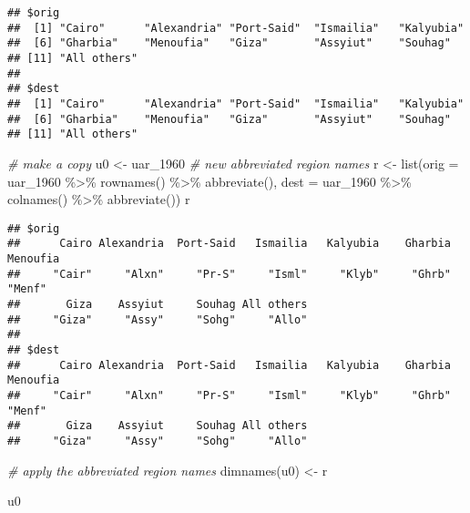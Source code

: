 \documentclass[
]{book}
\newenvironment{Shaded}{\begin{snugshade}}{\end{snugshade}}
\newcommand{\AttributeTok}[1]{\textcolor[rgb]{0.77,0.63,0.00}{#1}}
\newcommand{\CommentTok}[1]{\textcolor[rgb]{0.56,0.35,0.01}{\textit{#1}}}
\newcommand{\FunctionTok}[1]{\textcolor[rgb]{0.00,0.00,0.00}{#1}}
\newcommand{\NormalTok}[1]{#1}
\newcommand{\OtherTok}[1]{\textcolor[rgb]{0.56,0.35,0.01}{#1}}
\newcommand{\SpecialCharTok}[1]{\textcolor[rgb]{0.00,0.00,0.00}{#1}}
\begin{document}
\begin{verbatim}
## $orig
##  [1] "Cairo"      "Alexandria" "Port-Said"  "Ismailia"   "Kalyubia"  
##  [6] "Gharbia"    "Menoufia"   "Giza"       "Assyiut"    "Souhag"    
## [11] "All others"
## 
## $dest
##  [1] "Cairo"      "Alexandria" "Port-Said"  "Ismailia"   "Kalyubia"  
##  [6] "Gharbia"    "Menoufia"   "Giza"       "Assyiut"    "Souhag"    
## [11] "All others"
\end{verbatim}

\begin{Shaded}
\begin{Highlighting}[]
\CommentTok{\# make a copy}
\NormalTok{u0 }\OtherTok{\textless{}{-}}\NormalTok{ uar\_1960}
\CommentTok{\# new abbreviated region names}
\NormalTok{r }\OtherTok{\textless{}{-}} \FunctionTok{list}\NormalTok{(}\AttributeTok{orig =}\NormalTok{ uar\_1960 }\SpecialCharTok{\%\textgreater{}\%}
            \FunctionTok{rownames}\NormalTok{() }\SpecialCharTok{\%\textgreater{}\%}
            \FunctionTok{abbreviate}\NormalTok{(),}
          \AttributeTok{dest =}\NormalTok{ uar\_1960 }\SpecialCharTok{\%\textgreater{}\%}
            \FunctionTok{colnames}\NormalTok{() }\SpecialCharTok{\%\textgreater{}\%}
            \FunctionTok{abbreviate}\NormalTok{())}
\NormalTok{r}
\end{Highlighting}
\end{Shaded}

\begin{verbatim}
## $orig
##      Cairo Alexandria  Port-Said   Ismailia   Kalyubia    Gharbia   Menoufia 
##     "Cair"     "Alxn"     "Pr-S"     "Isml"     "Klyb"     "Ghrb"     "Menf" 
##       Giza    Assyiut     Souhag All others 
##     "Giza"     "Assy"     "Sohg"     "Allo" 
## 
## $dest
##      Cairo Alexandria  Port-Said   Ismailia   Kalyubia    Gharbia   Menoufia 
##     "Cair"     "Alxn"     "Pr-S"     "Isml"     "Klyb"     "Ghrb"     "Menf" 
##       Giza    Assyiut     Souhag All others 
##     "Giza"     "Assy"     "Sohg"     "Allo"
\end{verbatim}

\begin{Shaded}
\begin{Highlighting}[]
\CommentTok{\# apply the abbreviated region names}
\FunctionTok{dimnames}\NormalTok{(u0) }\OtherTok{\textless{}{-}}\NormalTok{ r}

\NormalTok{u0}
\end{Highlighting}
\end{Shaded}
\end{document}
